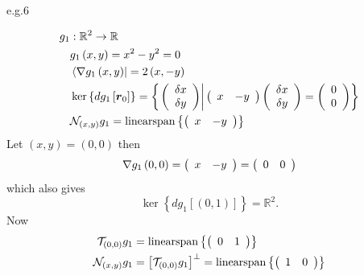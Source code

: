 \documentclass[aps,preprint]{revtex4}%
\begin{document}
e.g.6%

\begin{align}
g_{1}  &  :\mathbb{R}^{2}\rightarrow\mathbb{R}\nonumber\\
&  g_{1}\left(  x,y\right)  =x^{2}-y^{2}=0\nonumber\\
&  \left\langle \nabla g_{1}\left(  x,y\right)  \right\vert =2\left(
x,-y\right) \nonumber\\
&  \ker\left\{  dg_{1}\left[  \boldsymbol{r}_{0}\right]  \right\}  =\left\{
\left.  \left(
\begin{array}
[c]{c}%
\delta x\\
\delta y
\end{array}
\right)  \right\vert \left(
\begin{array}
[c]{cc}%
x & -y
\end{array}
\right)  \left(
\begin{array}
[c]{c}%
\delta x\\
\delta y
\end{array}
\right)  =\left(
\begin{array}
[c]{c}%
0\\
0
\end{array}
\right)  \right\} \nonumber\\
&  \mathcal{N}_{\left(  x,y\right)  }g_{1}=\operatorname*{linearspan}\left\{
\left(
\begin{array}
[c]{cc}%
x & -y
\end{array}
\right)  \right\}
\end{align}
Let $\left(  x,y\right)  =\left(  0,0\right)  $ then
\begin{equation}
\nabla g_{1}\left(  0,0\right)  =\left(
\begin{array}
[c]{cc}%
x & -y
\end{array}
\right)  =\left(
\begin{array}
[c]{cc}%
0 & 0
\end{array}
\right)
\end{equation}
which also gives
\begin{equation}
\ker\left\{  dg_{1}\left[  \left(  0,1\right)  \right]  \right\}
=\mathbb{R}^{2}.
\end{equation}
Now
\begin{align}
\mathcal{T}_{\left(  0,0\right)  }g_{1}  &  =\operatorname*{linearspan}%
\left\{  \left(
\begin{array}
[c]{cc}%
0 & 1
\end{array}
\right)  \right\} \nonumber\\
\mathcal{N}_{\left(  x,y\right)  }g_{1}  &  =\left[  \mathcal{T}_{\left(
0,0\right)  }g_{1}\right]  ^{\bot}=\operatorname*{linearspan}\left\{  \left(
\begin{array}
[c]{cc}%
1 & 0
\end{array}
\right)  \right\}
\end{align}
\end{document}
